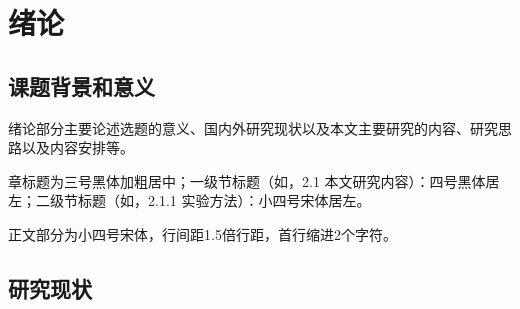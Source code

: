 \documentclass[fandol]{seuthesis-2022}
\title{}{（此栏可删除）}
\author{}
\begin{document}
\maketitle
\makedeclaration

\frontmatter
\begin{abstract}[zh]
  摘要内容独立于正文而存在，是论文内容高度概括的简要陈述，应准确、具体、完整地概括论文的主要信息，内容包括研究目的、方法、过程、成果、结论及主要创新之处等，不含图表，不加注释，具有独立性和完整性，一般为400字左右。
  
  “摘要”用三号黑体加粗居中，“摘”与“要”之间空4个半角空格。摘要正文内容用小四号宋体，固定1.5倍行距。
  
  论文的关键词是反映毕业设计（论文）主题内容的名词，一般为3-5个，排在摘要正文部分下方。关键词与摘要之间空一行。关键词之间用逗号分开，最后一个关键词后不加标点符号。
\end{abstract}

\begin{abstract}[en]
  英文摘要应与中文摘相对应，250个实词左右。采用第三人称介绍该学位论文内容，叙述的基本时态为一般现在时，确实需要强调过去的事情或者已经完成的行为才使用过去时、完成时等其他时态。
  
  ABSTRACT为三号Times New Roman加粗居中。
  
  英文摘要正文为小四号Times New Roman，固定1.5倍行距。英文关键词“KEY WORDS”大写，其后的关键词第一个字母大写，关键词之间用半角逗号隔开。
\end{abstract}

\tableofcontents

\mainmatter
\chapter{绪论}
\section{课题背景和意义}
绪论部分主要论述选题的意义、国内外研究现状以及本文主要研究的内容、研究思路以及内容安排等。

章标题为三号黑体加粗居中；一级节标题（如，2.1 本文研究内容）：四号黑体居左；二级节标题（如，2.1.1 实验方法）：小四号宋体居左。

正文部分为小四号宋体，行间距1.5倍行距，首行缩进2个字符。

\section{研究现状}
\end{document}
